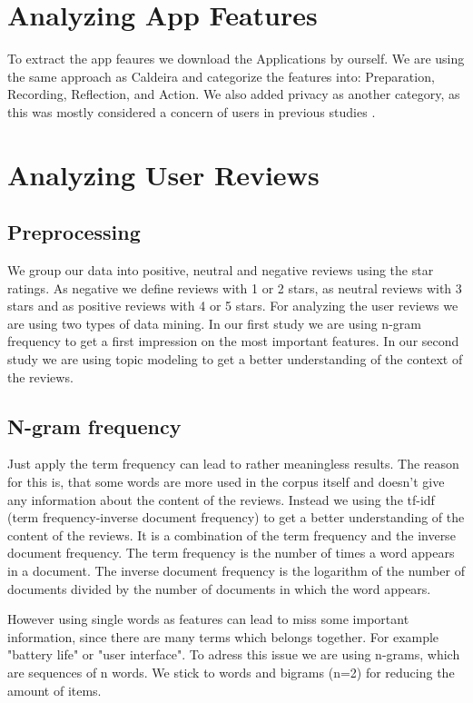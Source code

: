 \section{Analyzing App Features}
To extract the app feaures we download the Applications by ourself.
We are using the same approach as Caldeira \cite{caldeira2017mobile} and categorize the features into:
Preparation, Recording, Reflection, and Action.
We also added privacy as another category, as this was mostly considered a concern of users in previous studies \cite{Balaskas2022UnderstandingUP}.

\section{Analyzing User Reviews}
\subsection{Preprocessing}
We group our data into positive, neutral and negative reviews using the star ratings.
As negative we define reviews with 1 or 2 stars, as neutral reviews with 3 stars and as positive reviews with 4 or 5 stars.
\label{sec:analyzing-user-reviews}
For analyzing the user reviews we are using two types of data mining.
In our first study we are using n-gram frequency to get a first impression on the most important features.
In our second study we are using topic modeling to get a better understanding of the context of the reviews.
\subsection{N-gram frequency}
\label{sec:n-gram-frequency}
Just apply the term frequency can lead to rather meaningless results.
The reason for this is, that some words are more used in the corpus itself and doesn't give any information about the content of the reviews.
Instead we using the tf-idf (term frequency-inverse document frequency) to get a better understanding of the content of the reviews.
It is a combination of the term frequency and the inverse document frequency.
The term frequency is the number of times a word appears in a document.
The inverse document frequency is the logarithm of the number of documents divided by the number of documents in which the word appears.

However using single words as features can lead to miss some important information, since there are many terms which belongs together. 
For example "battery life" or "user interface".
To adress this issue we are using n-grams, which are sequences of n words.
We stick to words and bigrams (n=2) for reducing the amount of items.
